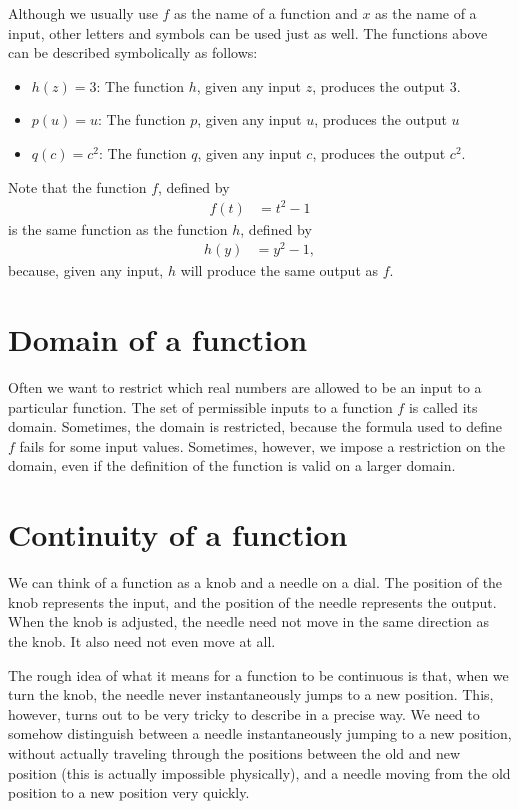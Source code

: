 \documentclass{math-deane}
\begin{document}
Although we usually use $f$ as the name of a function and $x$ as the name of a input, other letters and symbols can be used just as well. The functions above can be described symbolically as follows:

\begin{itemize}
\item $h(z) = 3$: The function $h$, given any input $z$, produces the output $3$.
\item $p(u) = u$: The function $p$, given any input $u$, produces the output $u$
\item $q(c) = c^2$: The function $q$, given any input $c$, produces the output $c^2$.
\end{itemize}

Note that the function $f$, defined by
\begin{align*}
f(t) &= t^2 - 1
\end{align*}
is the same function as the function $h$, defined by
\begin{align*}
h(y) &= y^2-1,
\end{align*}
because, given any input, $h$ will produce the same output as $f$.

\section{Domain of a function}

Often we want to restrict which real numbers are allowed to be an input to a particular function. The set of permissible inputs to a function $f$ is called its domain. Sometimes, the domain is restricted, because the formula used to define $f$ fails for some input values. Sometimes, however, we impose a restriction on the domain, even if the definition of the function is valid on a larger domain.

\section{Continuity of a function}

We can think of a function as a knob and a needle on a dial. The position of the knob represents the input, and the position of the needle represents the output. When the knob is adjusted, the needle need not move in the same direction as the knob. It also need not even move at all.

The rough idea of what it means for a function to be continuous is that, when we turn the knob, the needle never instantaneously jumps to a new position. This, however, turns out to be very tricky to describe in a precise way. We need to somehow distinguish between a needle instantaneously jumping to a new position, without actually traveling through the positions between the old and new position (this is actually impossible physically), and a needle moving from the old position to a new position very quickly.
\end{document}
